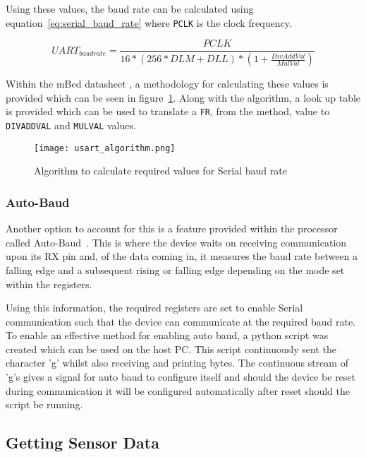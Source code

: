 Using these values, the baud rate can be calculated using equation~\ref{eq:serial_baud_rate} where \verb|PCLK| is the clock frequency\cite{mbed_datasheet}.

\begin{equation}
	\label{eq:serial_baud_rate}
	UART_{baud rate} = \frac{PCLK}{16 * (256 * DLM + DLL) * (1 + \frac{DivAddVal}{MulVal})}
\end{equation}

Within the mBed datasheet \cite{mbed_datasheet}, a methodology for calculating these values is provided which can be seen in figure~\ref{fig:serial_algo}. Along with the algorithm, a look up table is provided which can be used to translate a \verb|FR|, from the method, value to \verb|DIVADDVAL| and \verb|MULVAL| values. 

\begin{figure}
	\centering
	\texttt{[image: usart\_algorithm.png]}
	\caption{Algorithm to calculate required values for Serial baud rate~\cite{mbed_datasheet}}
	\label{fig:serial_algo}
\end{figure}

\subsubsection{Auto-Baud}

Another option to account for this is a feature provided within the processor called Auto-Baud~\cite{mbed_datasheet}. This is where the device waits on receiving communication upon its RX pin and, of the data coming in, it measures the baud rate between a falling edge and a subsequent rising or falling edge depending on the mode set within the registers.

Using this information, the required registers are set to enable Serial communication such that the device can communicate at the required baud rate. To enable an effective method for enabling auto baud, a python script was created which can be used on the host PC. This script continuously sent the character 'g' whilst also receiving and printing bytes. The continuous stream of 'g's gives a signal for auto baud to configure itself and should the device be reset during communication it will be configured automatically after reset should the script be running.

\subsection{Getting Sensor Data}

